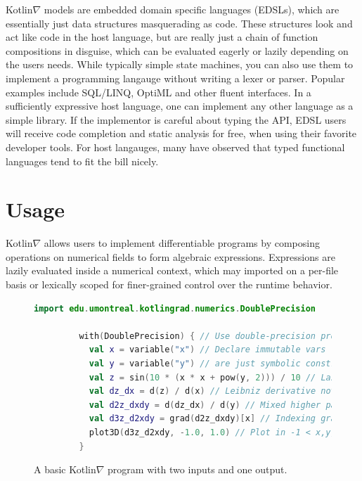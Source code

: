 \documentclass[12pt,initial,twoside,maitrise]{dms}
\numberwithin{equation}{section}
\numberwithin{table}{chapter}
\numberwithin{figure}{chapter}
\begin{document}
Kotlin$\nabla$ models are embedded domain specific languages (EDSLs), which are essentially just data structures masquerading as code. These structures look and act like code in the host language, but are really just a chain of function compositions in disguise, which can be evaluated eagerly or lazily depending on the users needs. While typically simple state machines, you can also use them to implement a programming langauge without writing a lexer or parser. Popular examples include SQL/LINQ\cite{meijer2006linq}, OptiML\cite{sujeeth2011optiml} and other fluent interfaces\cite{fowler05fluent}. In a sufficiently expressive host language, one can implement any other language as a simple library. If the implementor is careful about typing the API, EDSL users will receive code completion and static analysis for free, when using their favorite developer tools. For host langauges, many have observed that typed functional languages tend to fit the bill nicely\cite{elliott2003compiling,rompf2010lightweight}.

\section{Usage}

Kotlin$\nabla$ allows users to implement differentiable programs by composing operations on numerical fields to form algebraic expressions. Expressions are lazily evaluated inside a numerical context, which may imported on a per-file basis or lexically scoped for finer-grained control over the runtime behavior.

\begin{figure}[!htb]
    \begin{lstlisting}[caption={Simple code listing.}, language=Kotlin]
         import edu.umontreal.kotlingrad.numerics.DoublePrecision

         with(DoublePrecision) { // Use double-precision protocol
           val x = variable("x") // Declare immutable vars (these
           val y = variable("y") // are just symbolic constructs)
           val z = sin(10 * (x * x + pow(y, 2))) / 10 // Lazy exp
           val dz_dx = d(z) / d(x) // Leibniz derivative notation
           val d2z_dxdy = d(dz_dx) / d(y) // Mixed higher partial
           val d3z_d2xdy = grad(d2z_dxdy)[x] // Indexing gradient
           plot3D(d3z_d2xdy, -1.0, 1.0) // Plot in -1 < x,y,z < 1
         }
    \end{lstlisting}

    \caption{A basic Kotlin$\nabla$ program with two inputs and one output.}
    \label{label:fig1}
\end{figure}
\end{document}
